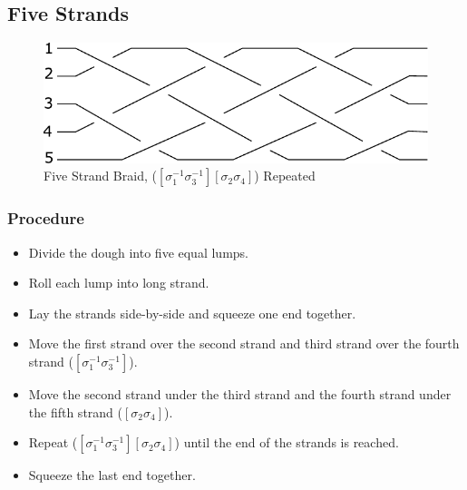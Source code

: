 \documentclass[10pt, openany]{book}
\begin{document}
\subsection{Five Strands}

\begin{figure}[h]
  \center
  \includegraphics{Figures/5-strands.pdf}
  \caption{Five Strand Braid, ($[\sigma^{-1}_1 \sigma^{-1}_3][\sigma_2\sigma_4]$) Repeated}
  \label{fig:5Strand}
\end{figure}

\subsubsection{Procedure}
\begin{itemize}
  \item Divide the dough into five equal lumps.
  \item Roll each lump into long strand.
  \item Lay the strands side-by-side and squeeze one end together.
  \item Move the first strand over the second strand and third strand over the fourth strand ($[\sigma^{-1}_1 \sigma^{-1}_3]$).
  \item Move the second strand under the third strand and the fourth strand under the fifth strand ($[\sigma_2\sigma_4]$).
  \item Repeat ($[\sigma^{-1}_1 \sigma^{-1}_3][\sigma_2\sigma_4]$) until the end of the strands is reached.
  \item Squeeze the last end together.
\end{itemize}
\end{document}

